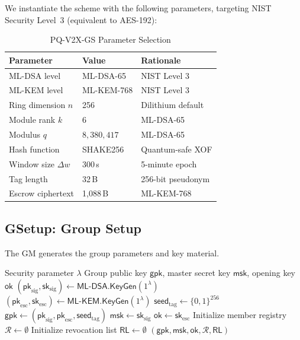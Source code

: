 \documentclass[conference,10pt]{IEEEtran}
\newcommand{\mlkem}{\textsf{ML-KEM}}
\newcommand{\mldsa}{\textsf{ML-DSA}}
\newcommand{\shake}{\textsf{SHAKE256}}
\newcommand{\secparam}{\lambda}
\begin{document}
We instantiate the scheme with the following parameters, targeting NIST Security Level~3 (equivalent to AES-192):

\begin{table}[h]
\centering
\caption{PQ-V2X-GS Parameter Selection}
\label{tab:params}
\begin{tabular}{@{}lll@{}}
\toprule
\textbf{Parameter} & \textbf{Value} & \textbf{Rationale} \\
\midrule
ML-DSA level       & ML-DSA-65      & NIST Level 3 \\
ML-KEM level       & ML-KEM-768     & NIST Level 3 \\
Ring dimension $n$ & 256            & Dilithium default \\
Module rank $k$    & 6              & ML-DSA-65 \\
Modulus $q$        & $8{,}380{,}417$ & ML-DSA-65 \\
Hash function      & \shake{}       & Quantum-safe XOF \\
Window size $\Delta w$ & 300\,s     & 5-minute epoch \\
Tag length         & 32\,B          & 256-bit pseudonym \\
Escrow ciphertext  & 1{,}088\,B     & ML-KEM-768 \\
\bottomrule
\end{tabular}
\end{table}

\subsection{GSetup: Group Setup}

The GM generates the group parameters and key material.

\begin{algorithm}[h]
\caption{$\mathsf{GSetup}(1^\secparam)$: Group Setup}
\label{alg:gsetup}
\begin{algorithmic}[1]
\REQUIRE Security parameter $\secparam$
\ENSURE Group public key $\mathsf{gpk}$, master secret key $\mathsf{msk}$, opening key $\mathsf{ok}$
\STATE $(\mathsf{pk}_{\mathrm{sig}}, \mathsf{sk}_{\mathrm{sig}}) \leftarrow \mldsa.\mathsf{KeyGen}(1^\secparam)$
\STATE $(\mathsf{pk}_{\mathrm{esc}}, \mathsf{sk}_{\mathrm{esc}}) \leftarrow \mlkem.\mathsf{KeyGen}(1^\secparam)$
\STATE $\mathsf{seed}_{\mathrm{tag}} \leftarrow \{0,1\}^{256}$
\STATE $\mathsf{gpk} \leftarrow (\mathsf{pk}_{\mathrm{sig}}, \mathsf{pk}_{\mathrm{esc}}, \mathsf{seed}_{\mathrm{tag}})$
\STATE $\mathsf{msk} \leftarrow \mathsf{sk}_{\mathrm{sig}}$
\STATE $\mathsf{ok} \leftarrow \mathsf{sk}_{\mathrm{esc}}$
\STATE Initialize member registry $\mathcal{R} \leftarrow \emptyset$
\STATE Initialize revocation list $\mathsf{RL} \leftarrow \emptyset$
\RETURN $(\mathsf{gpk}, \mathsf{msk}, \mathsf{ok}, \mathcal{R}, \mathsf{RL})$
\end{algorithmic}
\end{algorithm}
\end{document}
